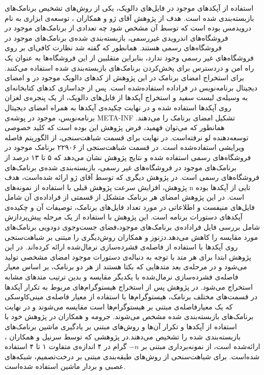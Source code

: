 استفاده از آپکد‌های موجود در فایل‌های دالویک، یکی از روش‌های تشخیص برنامک‌های بازبسته‌بندی شده است. هدف از پژوهش آقای ژو و همکاران ، توسعه‌ی ابزاری به نام درویدمس بوده است که توسط آن مشخص شود چه تعدادی از برنامک‌های موجود در فروشگاه‌های اندرویدی غیررسمی، بازبسته‌بندی شده‌ی برنامک‌های موجود در فروشگاه‌های رسمی هستند. همانطور که گفته شد نظارت کافی‌ای بر روی فروشگاه‌های غیر رسمی وجود ندارد، بنابراین متقلبین از این فروشگاه‌ها به عنوان یک راه امن و دردسترس برای پخش‌کردن برنامک‌های بازبسته‌بندی شده استفاده می‌کنند. برای استخراج امضا‌ی برنامک در این پژوهش از کد‌های دالویک موجود در  و امضای دیجیتال برنامه‌نویس در فراداده‌ استفاده‌شده است. پس از جداسازی کد‌های کتابخانه‌ای به وسیله‌ی لیست سفید و استخراج آپکد‌ها از فایل‌های دالویک، از یک پنجره‌ی لغزان روی آپکد‌ها استفاده شده و در نهایت چکیده‌ی آپکد‌ها به همراه امضای دیجیتال برنامه‌نویس، موجود در پوشه‌ی META-INF تشکیل امضا‌ی برنامک را می‌دهند. همانطور که می‌توان فهمید، فرض پژوهش این بوده است که کلید خصوصی توسعه‌دهنده لو نرفته‌است. در نهایت برای قسمت‌ شباهت‌سنجی، از الگوریتم فاصله ویرایشی استفاده‌شده است. در قسمت شباهت‌سنجی از ۲۲۹۰۶ برنامک موجود در فروشگاه‌های رسمی استفاده شده‌ و نتایج پژوهش نشان می‌دهد که ۵ تا ۱۳ درصد از برنامک‌های موجود در فروشگاه‌های غیر رسمی، بازبسته‌بندی شده‌ی برنامک‌های فروشگاه‌های رسمی است. در پژوهش دیگری که توسط آقای ژو ارائه شده‌است، هدف پژوهش، افزایش سرعت پژوهش‌ قبلی با استفاده از نمونه‌های n تایی از آپکد‌ها بوده است. در این پژوهش امضای هر برنامک متشکل از قسمتی از فراداده‌ی آن شامل فایل‌های منیفست و اطلاعاتی در مورد تعداد فایل‌های برنامک، توصیفات آن و چکیده‌ی آپکد‌های دستورات برنامه‌ است. این پژوهش با استفاده از یک مرحله پیش‌پردازش شامل بررسی فایل فراداده‌ی برنامک‌های موجود،‌فضای جست‌و‌جوی دودویی برنامک‌های مورد مقایسه را کاهش می‌دهد.دزنوز و همکاران روش‌دیگری را مبتنی بر شباهت‌سنجی روی آپکد‌ها با استفاده از فاصله‌ی فشرده‌سازی نرما‌ل‌شده ارائه کرده‌اند. در این پژوهش ابتدا برای هر متد با توجه به دنباله‌ی دستورات موجود امضای مشخصی تولید می‌شود و در مرحله‌ی بعد متد‌هایی که بکتا هستند از هر دو برنامک، بر اساس معیار فاصله‌ی فشرده‌سازی نرمال‌شده با یکدیگر مقایسه و بدین ترتیب متد‌های مشابه‌ استخراج می‌شود. در پژوهش  پس از استخراج هیستوگرام‌های مربوط به تکرار آپکد‌ها در قسمت‌های مختلف برنامک، هیستوگرام‌ها با استفاده از معیار فاصله‌ی  مینی‌کاوسکی که یک معیارفاصله‌ی مبتنی بر هیستوگرام‌ها است مقایسه‌ می‌شوند و در نهایت برنامک‌های بازبسته‌بندی شده مشخص می‌شوند. جرومه و همکاران در پژوهش خود با استفاده از آپکد‌ها و تکرار آن‌ها و روش‌های مبتنی بر یادگیری ماشین برنامک‌های بازبسته‌بندی شده را تشخیص می‌دهند.در پژوهشی که توسط سرنیل و همکاران ، ارائه‌شده است، از نمونه‌برداری مبتنی بر $-n$ گرام در ۴ اندازه‌ی متفاوت ۱ تا ۴ استفاده شده‌است. برای شباهت‌سنحی از روش‌های طبقه‌بندی مبتنی بر درخت‌تصمیم، شبکه‌های عصبی و بردار ماشین استفاده شده‌است.

